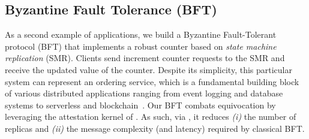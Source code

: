 \noindent{}



\subsection{Byzantine Fault Tolerance (BFT)}\label{sec:use_cases::byz_smr}

As a second example of \projecttitle{} applications, we build a Byzantine Fault-Tolerant protocol (BFT) that implements a robust counter based on {\em state machine replication} (SMR). Clients send increment counter requests to the SMR and receive the updated value of the counter. Despite its simplicity, this particular system can represent an ordering service, which is a fundamental building block of various distributed applications ranging from event logging and database systems to serverless and blockchain~\cite{rafthyperledger, Kafka, boki, 10.1145/3286685.3286686, scalog}. Our BFT combats equivocation by leveraging the attestation kernel of \projecttitle{}. As such, via \projecttitle{}, it reduces \textit{(i)} the number of replicas and \textit{(ii)} the message complexity (and latency) required by classical BFT.

